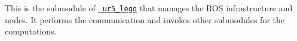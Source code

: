 This is the submodule of \href{https://github.com/AlphaNightLight/ur5_lego}{\texttt{ ur5\+\_\+lego}} that manages the R\+OS infrastructure and nodes. It performs the communication and invokes other submodules for the computations. 